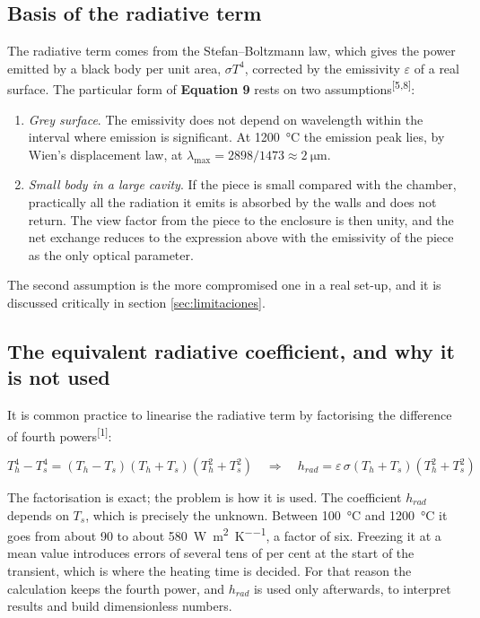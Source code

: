 \documentclass[11pt,a4paper]{article}
\newcommand{\cita}[1]{\textsuperscript{[\textcolor{uji}{#1}]}}
\newcommand{\ecu}[1]{\textbf{\textcolor{uji}{Equation #1}}}
\begin{document}
\subsection{Basis of the radiative term}

The radiative term comes from the Stefan--Boltzmann law, which gives the
power emitted by a black body per unit area, $\sigma T^{4}$, corrected by
the emissivity $\varepsilon$ of a real surface. The particular form of
\ecu{9} rests on two assumptions\cita{5,8}:

\begin{enumerate}
\item \emph{Grey surface}. The emissivity does not depend on wavelength
within the interval where emission is significant. At \SI{1200}{\celsius}
the emission peak lies, by Wien's displacement law, at
$\lambda_{\max} = 2898/1473 \approx \SI{2}{\micro\meter}$.

\item \emph{Small body in a large cavity}. If the piece is small compared
with the chamber, practically all the radiation it emits is absorbed by the
walls and does not return. The view factor from the piece to the enclosure
is then unity, and the net exchange reduces to the expression above with
the emissivity of the piece as the only optical parameter.
\end{enumerate}

The second assumption is the more compromised one in a real set-up, and it
is discussed critically in section \ref{sec:limitaciones}.

\subsection{The equivalent radiative coefficient, and why it is not used}

It is common practice to linearise the radiative term by factorising the
difference of fourth powers\cita{1}:

\begin{equation}
T_{h}^{4} - T_{s}^{4}
= \left( T_{h} - T_{s} \right)\left( T_{h} + T_{s} \right)
  \left( T_{h}^{2} + T_{s}^{2} \right)
\quad \Rightarrow \quad
h_{rad} = \varepsilon\, \sigma \left( T_{h} + T_{s} \right)
          \left( T_{h}^{2} + T_{s}^{2} \right)
\end{equation}

The factorisation is exact; the problem is how it is used. The coefficient
$h_{rad}$ depends on $T_{s}$, which is precisely the unknown. Between
\SI{100}{\celsius} and \SI{1200}{\celsius} it goes from about \num{90} to
about \SI{580}{\watt\per\meter\squared\per\kelvin}, a factor of six.
Freezing it at a mean value introduces errors of several tens of per cent
at the start of the transient, which is where the heating time is decided.
For that reason the calculation keeps the fourth power, and $h_{rad}$ is
used only afterwards, to interpret results and build dimensionless numbers.
\end{document}
